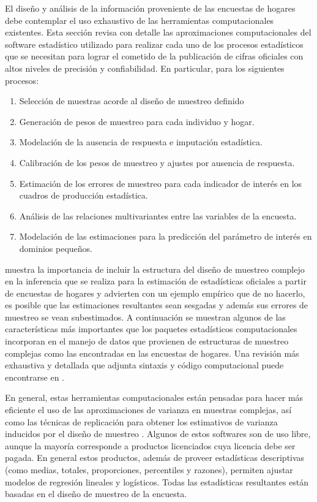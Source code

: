 \documentclass[
  12pt,
  spanish,
]{book}
\providecommand{\tightlist}{%
  \setlength{\itemsep}{0pt}\setlength{\parskip}{0pt}}
\begin{document}
El diseño y análisis de la información proveniente de las encuestas de hogares debe contemplar el uso exhaustivo de las herramientas computacionales existentes. Esta sección revisa con detalle las aproximaciones computacionales del software estadístico utilizado para realizar cada uno de los procesos estadísticos que se necesitan para lograr el cometido de la publicación de cifras oficiales con altos niveles de precisión y confiabilidad. En particular, para los siguientes procesos:

\begin{enumerate}
\def\labelenumi{\arabic{enumi}.}
\tightlist
\item
  Selección de muestras acorde al diseño de muestreo definido
\item
  Generación de pesos de muestreo para cada individuo y hogar.
\item
  Modelación de la ausencia de respuesta e imputación estadística.
\item
  Calibración de los pesos de muestreo y ajustes por ausencia de respuesta.
\item
  Estimación de los errores de muestreo para cada indicador de interés en los cuadros de producción estadística.
\item
  Análisis de las relaciones multivariantes entre las variables de la encuesta.
\item
  Modelación de las estimaciones para la predicción del parámetro de interés en dominios pequeños.
\end{enumerate}

\citet[sección 7.8]{United_Nations_2005} muestra la importancia de incluir la estructura del diseño de muestreo complejo en la inferencia que se realiza para la estimación de estadísticas oficiales a partir de encuestas de hogares y advierten con un ejemplo empírico que de no hacerlo, es posible que las estimaciones resultantes sean sesgadas y además sus errores de muestreo se vean subestimados. A continuación se muestran algunos de las características más importantes que los paquetes estadísticos computacionales incorporan en el manejo de datos que provienen de estructuras de muestreo complejas como las encontradas en las encuestas de hogares. Una revisión más exhaustiva y detallada que adjunta sintaxis y código computacional puede encontrarse en \citet[Apéndice A]{Heeringa_West_Berglund_2010}.

En general, estas herramientas computacionales están pensadas para hacer más eficiente el uso de las aproximaciones de varianza en muestras complejas, así como las técnicas de replicación para obtener los estimativos de varianza inducidos por el diseño de muestreo \citep{Westat_2007}. Algunos de estos softwares son de uso libre, aunque la mayoría corresponde a productos licenciados cuya licencia debe ser pagada. En general estos productos, además de proveer estadísticas descriptivas (como medias, totales, proporciones, percentiles y razones), permiten ajustar modelos de regresión lineales y logísticos. Todas las estadísticas resultantes están basadas en el diseño de muestreo de la encuesta.
\end{document}

